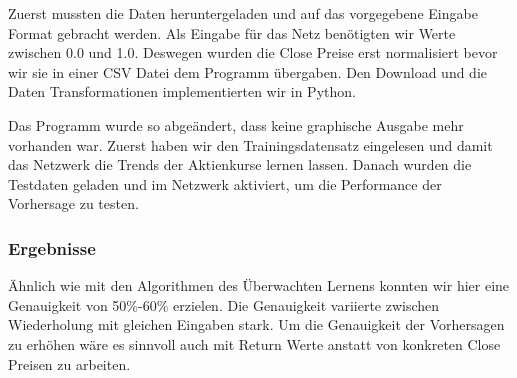 \documentclass[12pt]{article} %
\begin{document}
Zuerst mussten die Daten heruntergeladen und auf das vorgegebene Eingabe Format gebracht werden. Als Eingabe für das Netz benötigten wir Werte zwischen 0.0 und 1.0. Deswegen wurden die Close Preise erst normalisiert bevor wir sie in einer CSV Datei dem Programm übergaben. Den Download und die Daten Transformationen implementierten wir in Python.

Das Programm wurde so abgeändert, dass keine graphische Ausgabe mehr vorhanden war. Zuerst haben wir den Trainingsdatensatz eingelesen und damit das Netzwerk die Trends der Aktienkurse lernen lassen. Danach wurden die Testdaten geladen und im Netzwerk aktiviert, um die Performance der Vorhersage zu testen.

\subsubsection{Ergebnisse}

Ähnlich wie mit den Algorithmen des Überwachten Lernens konnten wir hier eine Genauigkeit von 50\%-60\% erzielen. Die Genauigkeit variierte zwischen Wiederholung mit gleichen Eingaben stark. Um die Genauigkeit der Vorhersagen zu erhöhen wäre es sinnvoll auch mit Return Werte anstatt von konkreten Close Preisen zu arbeiten.
 








\end{document}
